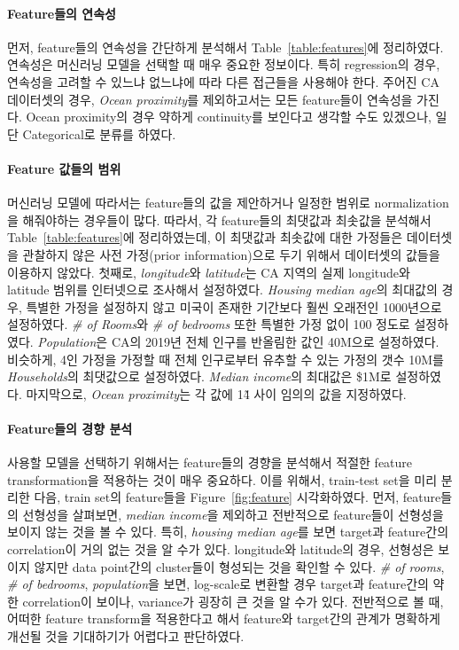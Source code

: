 \documentclass[ba, 11pt]{imsart}
\begin{document}
\paragraph{Feature들의 연속성}
먼저, feature들의 연속성을 간단하게 분석해서 Table~\ref{table:features}에 정리하였다.
연속성은 머신러닝 모델을 선택할 때 매우 중요한 정보이다.
특히 regression의 경우, 연속성을 고려할 수 있느냐 없느냐에 따라 다른 접근들을 사용해야 한다.
주어진 CA 데이터셋의 경우, \textit{Ocean proximity}를 제외하고서는 모든 feature들이 연속성을 가진다.
Ocean proximity의 경우 약하게 continuity를 보인다고 생각할 수도 있겠으나, 일단 Categorical로 분류를 하였다.

\paragraph{Feature 값들의 범위}
머신러닝 모델에 따라서는 feature들의 값을 제안하거나 일정한 범위로 normalization을 해줘야하는 경우들이 많다.
따라서, 각 feature들의 최댓값과 최솟값을 분석해서 Table~\ref{table:features}에 정리하였는데, 이 최댓값과 최솟값에 대한 가정들은 데이터셋을 관찰하지 않은 사전 가정(prior information)으로 두기 위해서 데이터셋의 값들을 이용하지 않았다.
첫째로, \textit{longitude}와 \textit{latitude}는 CA 지역의 실제 longitude와 latitude 범위를 인터넷으로 조사해서 설정하였다.
\textit{Housing median age}의 최대값의 경우, 특별한 가정을 설정하지 않고 미국이 존재한 기간보다 훨씬 오래전인 1000년으로 설정하였다.
\textit{\# of Rooms}와 \textit{\# of bedrooms} 또한 특별한 가정 없이 100 정도로 설정하였다.
\textit{Population}은 CA의 2019년 전체 인구를 반올림한 값인 40M으로 설정하였다.
비슷하게, 4인 가정을 가정할 때 전체 인구로부터 유추할 수 있는 가정의 갯수 10M를 \textit{Households}의 최댓값으로 설정하였다.
\textit{Median income}의 최대값은 \$1M로 설정하였다.
마지막으로, \textit{Ocean proximity}는 각 값에 1\~4 사이 임의의 값을 지정하였다.

\paragraph{Feature들의 경향 분석}
사용할 모델을 선택하기 위해서는 feature들의 경향을 분석해서 적절한 feature transformation을 적용하는 것이 매우 중요하다.
이를 위해서, train-test set을 미리 분리한 다음, train set의 feature들을 Figure~\ref{fig:feature} 시각화하였다.
먼저, feature들의 선형성을 살펴보면, \textit{median income}을 제외하고 전반적으로 feature들이 선형성을 보이지 않는 것을 볼 수 있다.
특히, \textit{housing median age}를 보면 target과 feature간의 correlation이 거의 없는 것을 알 수가 있다.
longitude와 latitude의 경우, 선형성은 보이지 않지만 data point간의 cluster들이 형성되는 것을 확인할 수 있다.
\textit{\# of rooms}, \textit{\# of bedrooms}, \textit{population}을 보면, log-scale로 변환할 경우 target과 feature간의 약한 correlation이 보이나, variance가 굉장히 큰 것을 알 수가 있다.
전반적으로 볼 때, 어떠한 feature transform을 적용한다고 해서 feature와 target간의 관계가 명확하게 개선될 것을 기대하기가 어렵다고 판단하였다.
\end{document}
